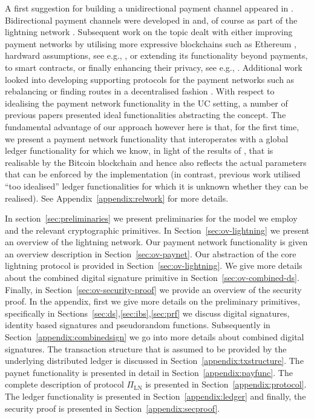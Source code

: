  A first suggestion for building a unidirectional
payment channel appeared in \cite{spilman}. Bidirectional payment channels were
developed in \cite{DBLP:conf/sss/DeckerW15} and, of course as part of the
lightning network \cite{lightning}. Subsequent work on the topic dealt with
either improving payment networks by utilising more expressive blockchains such
as Ethereum \cite{perun}, hardward assumptions, see e.g.,
\cite{DBLP:conf/systor/LindNEKPS18}, or extending its functionality beyond
payments, to smart contracts, \cite{sprites} or finally enhancing their privacy,
see e.g.,
\cite{Malavolta:2017:CPP:3133956.3134096,DBLP:conf/ccs/0001M17,DBLP:conf/ndss/HeilmanABSG17}.
Additional work looked into developing supporting protocols for the payment
networks such as rebalancing \cite{DBLP:conf/ccs/KhalilG17} or finding routes in
a decentralised fashion \cite{flare,spider}. With respect to idealising the
payment network functionality in the UC setting, a number of previous papers
\cite{DBLP:conf/ccs/DziembowskiFH18,Malavolta:2017:CPP:3133956.3134096,sprites,perun}
presented ideal functionalities abstracting the concept. The fundamental
advantage of our approach however here is that, for the first time, we present a
payment network functionality that interoperates with a global ledger
functionality for which we know, in light of the results of \cite{BMTZ17}, that
is realisable by the Bitcoin blockchain and hence also reflects the actual
parameters that can be enforced by the implementation (in contrast, previous
work utilised ``too idealised'' ledger functionalities for which it is unknown
whether they can be realised). See Appendix~\ref{appendix:relwork} for more
details.

 In section~\ref{sec:preliminaries} we present
preliminaries for the model we employ and the relevant cryptographic primitives.
In Section~\ref{sec:ov-lightning} we present an overview of the lightning
network. Our payment network functionality is given an overview description in
Section~\ref{sec:ov-paynet}. Our abstraction of the core lightning protocol is
provided in Section~\ref{sec:ov-lightning}. We give more details about the
combined digital signature primitive in Section~\ref{sec:ov-combined-ds}.
Finally, in Section~\ref{sec:ov-security-proof} we provide an overview of the
security proof. In the appendix, first we give more details on the preliminary
primitives, specifically in Sections~\ref{sec:ds},\ref{sec:ibs},\ref{sec:prf} we
discuss digital signatures, identity based signatures and pseudorandom
functions. Subsequently in Section~\ref{appendix:combinedsign} we go into more
details about combined digital signatures. The transaction structure that is
assumed to be provided by the underlying distributed ledger is discussed in
Section~\ref{appendix:txstructure}. The paynet functionality is presented in
detail in Section~\ref{appendix:payfunc}. The complete description of protocol
$\Pi_{\mathrm{LN}}$ is presented in Section~\ref{appendix:protocol}. The ledger
functionality is presented in Section~\ref{appendix:ledger} and finally, the
security proof is presented in Section~\ref{appendix:secproof}.
